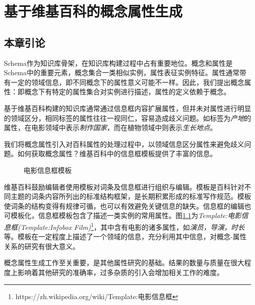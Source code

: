 \chapter{基于维基百科的概念属性生成}
\label{cha:concept-property}

\section{本章引论}

Schema作为知识库骨架，在知识库构建过程中占有重要地位。概念和属性是Schema中的重要元素，概念集合一类相似实例，属性表征实例特征。属性通常带有一定的领域信息，即不同概念下的属性意义可能不一样。因此，我们提出概念属性：即概念下有特定的属性集合对实例进行描述，属性的定义依赖于概念。

基于维基百科构建的知识库通常通过信息框内容扩展属性，但并未对属性进行明显的领域区分，相同标签的属性往往一视同仁，容易造成歧义问题。如标签为\textit{产地}的属性，在电影领域中表示\textit{制作国家}，而在植物领域中则表示\textit{生长地点}。

我们将概念属性引入对百科属性的处理过程中，以领域信息区分属性来避免歧义问题。如何获取概念属性？维基百科中的信息框模板提供了丰富的信息。



\begin{figure}[ht]
  \centering
  \caption{电影信息框模板}
  \label{fig:template-infobox-film}
\end{figure}

维基百科鼓励编辑者使用模板对词条及信息框进行组织与编辑。模板是百科针对不同主题的词条内容所列出的标准结构框架，是长期积累形成的标准写作规范。模板使词条的结构变得有规律可循，也可以有效避免关键信息的缺失。信息框的编辑也可模板化，信息框模板包含了描述一类实例的常用属性。图\ref{fig:template-infobox-film}为\textit{Template:电影信息框(Template:Infobox Film)}\footnote{https://zh.wikipedia.org/wiki/Template:电影信息框}，其中含有电影的诸多属性，如\textit{演员，导演，时长}等。模板在一定程度上描述了一个领域的信息，充分利用其中信息，对概念-属性关系的研究有很大意义。

概念属性生成工作至关重要，是其他属性研究的基础。结果的数量与质量在很大程度上影响着其他研究的准确率，过多杂质的引入会增加相关工作的难度。

